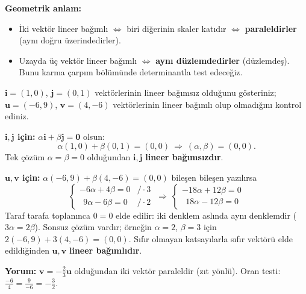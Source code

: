 \textbf{Geometrik anlam:}
\begin{itemize}
\item İki vektör lineer bağımlı $\iff$ biri diğerinin skaler katıdır $\iff$ \textbf{paraleldirler} (aynı doğru üzerindedirler).
\item Uzayda üç vektör lineer bağımlı $\iff$ \textbf{aynı düzlemdedirler} (düzlemdeş). Bunu karma çarpım bölümünde determinantla test edeceğiz.
\end{itemize}

\begin{soru}
$\mathbf i=(1,0)$, $\mathbf j=(0,1)$ vektörlerinin lineer bağımsız olduğunu gösteriniz; $\mathbf u=(-6,9)$, $\mathbf v=(4,-6)$ vektörlerinin lineer bağımlı olup olmadığını kontrol ediniz.
\end{soru}
\begin{cevap}
\textbf{$\mathbf i,\mathbf j$ için:} $\alpha\mathbf i+\beta\mathbf j=\mathbf 0$ olsun:
\[
\alpha(1,0)+\beta(0,1)=(0,0)\ \Rightarrow\ (\alpha,\beta)=(0,0).
\]
Tek çözüm $\alpha=\beta=0$ olduğundan $\mathbf i,\mathbf j$ \textbf{lineer bağımsızdır}.

\textbf{$\mathbf u,\mathbf v$ için:} $\alpha(-6,9)+\beta(4,-6)=(0,0)$ bileşen bileşen yazılırsa
\[
\begin{cases}-6\alpha+4\beta=0 & /\cdot 3\\ \ \ 9\alpha-6\beta=0 & /\cdot 2\end{cases}
\ \Rightarrow\
\begin{cases}-18\alpha+12\beta=0\\ \ \ 18\alpha-12\beta=0\end{cases}
\]
Taraf tarafa toplanınca $0=0$ elde edilir: iki denklem aslında aynı denklemdir ($3\alpha=2\beta$). Sonsuz çözüm vardır; örneğin $\alpha=2$, $\beta=3$ için $2(-6,9)+3(4,-6)=(0,0)$. Sıfır olmayan katsayılarla sıfır vektörü elde edildiğinden $\mathbf u,\mathbf v$ \textbf{lineer bağımlıdır}.

\textbf{Yorum:} $\mathbf v=-\frac23\mathbf u$ olduğundan iki vektör paraleldir (zıt yönlü). Oran testi: $\frac{-6}{4}=\frac{9}{-6}=-\frac32$.
\end{cevap}

